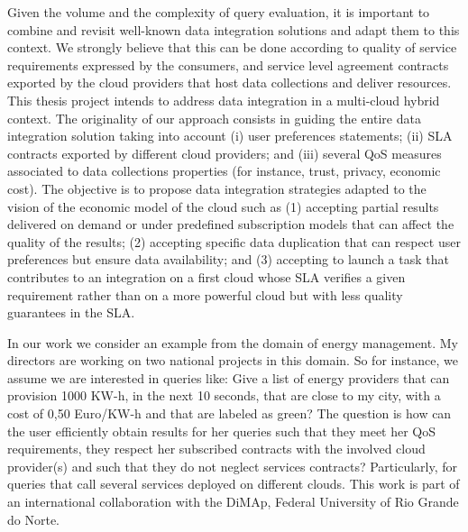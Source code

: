 \documentclass[11pt,a4paper,oneside]{report}
\begin{document}
Given the volume and the complexity of query evaluation, it is important to combine and revisit well-known data integration solutions and adapt them to this context. We strongly believe that this can be done according to quality of service requirements expressed by the consumers, and service level agreement contracts exported by the cloud providers that host data collections and deliver resources. This thesis project intends to address data integration in a multi-cloud hybrid context. The originality of our approach consists in guiding the entire data integration solution taking into account (i) user preferences statements; (ii) SLA contracts exported by different cloud providers; and (iii) several QoS measures associated to data collections properties (for instance, trust, privacy, economic cost). The objective is to propose data integration strategies adapted to the vision of the economic model of the cloud such as (1) accepting partial results delivered on demand or under predefined subscription models that can affect the quality of the results; (2) accepting specific data duplication that can respect user preferences but ensure data availability; and (3) accepting to launch a task that contributes to an integration on a first cloud whose SLA verifies a given requirement rather than on a more powerful cloud but with less quality guarantees in the SLA.


In our work we consider an example from the domain of energy management. My directors are working on two national projects in this domain. So for instance, we assume we are interested in queries like: Give a list of energy providers that can provision 1000 KW-h, in the next 10 seconds, that are close to my city, with a cost of 0,50 Euro/KW-h and that are labeled as green? The question is how can the user efficiently obtain results for her queries such that they meet her QoS requirements, they respect her subscribed contracts with the involved cloud provider(s) and such that they do not neglect services contracts? Particularly, for queries that call several services deployed on different clouds. This work is part of an international collaboration with the DiMAp, Federal University of Rio Grande do Norte.
\end{document}
